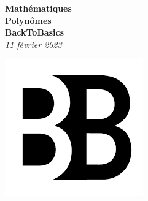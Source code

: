 \begin{center}

    \vspace{15px}
    \Huge{\textbf{Mathématiques}}\\
	\huge{\textbf{Polynômes}}\\
	\vspace{10px}
	\Large{\textbf{BackToBasics}}\\
	\textit{11 février 2023}

    \vspace{25px}
	\includegraphics{img/b2b.png}
	
\end{center}
